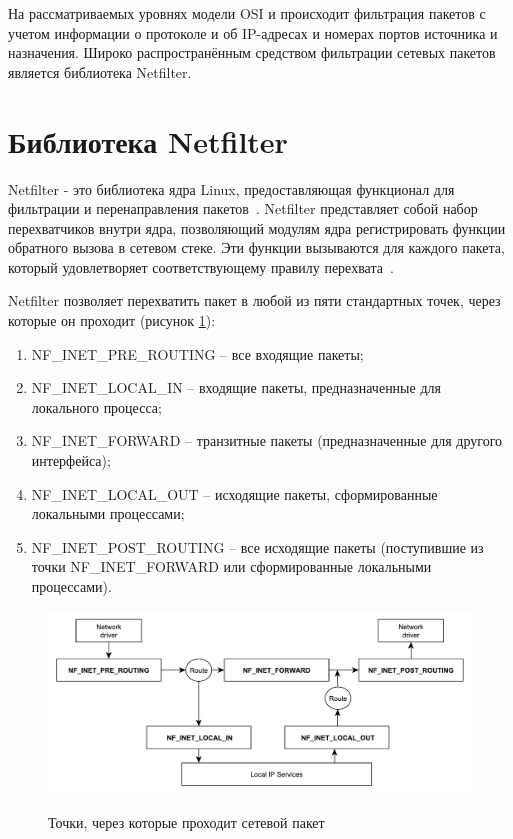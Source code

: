 


На рассматриваемых уровнях модели OSI и происходит фильтрация пакетов с учетом информации о протоколе и об IP-адресах и номерах портов источника и назначения. Широко распространённым средством фильтрации сетевых пакетов является библиотека Netfilter.

\section{Библиотека Netfilter}

Netfilter - это библиотека ядра Linux, предоставляющая функционал для фильтрации и перенаправления пакетов~\cite{b7}. Netfilter представляет собой набор перехватчиков внутри ядра, позволяющий модулям ядра регистрировать функции обратного вызова в сетевом стеке. Эти функции вызываются для каждого пакета, который удовлетворяет соответствующему правилу перехвата~\cite{netfilter}.


Netfilter позволяет перехватить пакет в любой из пяти стандартных точек, через которые он проходит (рисунок \ref{img:packets}):


\begin{enumerate}
	\item NF\_INET\_PRE\_ROUTING -- все входящие пакеты;
	\item NF\_INET\_LOCAL\_IN -- входящие пакеты, предназначенные для локального процесса;
	\item NF\_INET\_FORWARD -- транзитные пакеты (предназначенные для другого интерфейса);
	\item NF\_INET\_LOCAL\_OUT -- исходящие пакеты, сформированные локальными процессами;
	\item NF\_INET\_POST\_ROUTING -- все исходящие пакеты (поступившие из точки NF\_INET\_FORWARD или сформированные локальными процессами).
\end{enumerate}

\clearpage
\begin{figure}[h]
	\centering
	\begin{center}
		{\includegraphics[scale=0.6]{inc/img/packets.pdf}}
		\caption{Точки, через которые проходит сетевой пакет}
		\label{img:packets}
	\end{center}
\end{figure} 


